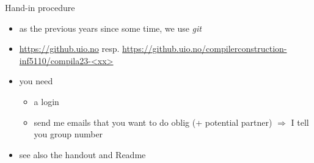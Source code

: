 \documentclass{beamer}
\begin{document}
\begin{frame}[label={sec:org011a822}]{Hand-in procedure}
\begin{itemize}
\item as the previous years since some time, we use  \emph{git}

\item \url{https://github.uio.no} resp. \href{https://github.uio.no/compilerconstruction-inf5110/compila}{https://github.uio.no/compilerconstruction-inf5110/compila23-<xx>}

\item you need

\begin{itemize}
\item a login
\item send me emails that you want to do oblig (+ potential partner)
\(\Rightarrow\) I tell you group number
\end{itemize}
\end{itemize}


\begin{itemize}
\item see also the \alert{handout} and \alert{Readme}
\end{itemize}
\end{frame}







\end{document}
